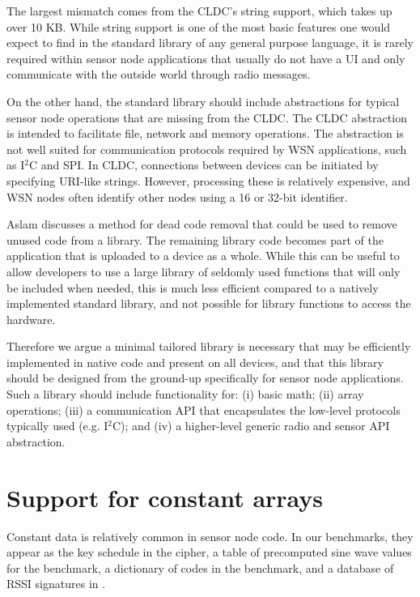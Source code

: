 The largest mismatch comes from the CLDC's string support, which takes up over 10 KB. While string support is one of the most basic features one would expect to find in the standard library of any general purpose language, it is rarely required within sensor node applications that usually do not have a UI and only communicate with the outside world through radio messages.

On the other hand, the standard library should include abstractions for typical sensor node operations that are missing from the CLDC. The CLDC  abstraction is intended to facilitate file, network and memory operations. The abstraction is not well suited for communication protocols required by WSN applications, such as I$^{2}$C and SPI. In CLDC, connections between devices can be initiated by specifying URI-like strings. However, processing these is relatively expensive, and WSN nodes often identify other nodes using a 16 or 32-bit identifier.

 

Aslam \cite{Aslam:2011thesis} discusses a method for dead code removal that could be used to remove unused code from a library. The remaining library code becomes part of the application that is uploaded to a device as a whole. While this can be useful to allow developers to use a large library of seldomly used functions that will only be included when needed, this is much less efficient compared to a natively implemented standard library, and not possible for library functions to access the hardware.

Therefore we argue a minimal tailored library is necessary that may be efficiently implemented in native code and present on all devices, and that this library should be designed from the ground-up specifically for sensor node applications. Such a library should include functionality for: (i) basic math; (ii) array operations; (iii) a communication API that encapsulates the low-level protocols typically used (e.g. I$^{2}$C); and (iv) a higher-level generic radio and sensor API abstraction.




\section{Support for constant arrays}
\label{sec-const-data}
Constant data is relatively common in sensor node code. In our benchmarks, they appear as the key schedule in the  cipher, a table of precomputed sine wave values for the  benchmark, a dictionary of codes in the  benchmark, and a database of RSSI signatures in .

